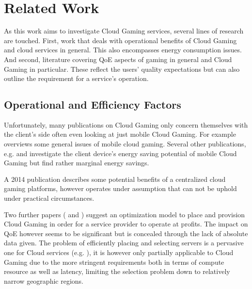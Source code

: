 \section{Related Work}
\label{sec:relatedwork}

As this work aims to investigate Cloud Gaming services, several lines of research are touched. 
First, work that deals with operational benefits of Cloud Gaming and cloud services in general. This also encompasses energy consumption issues.
And second, literature covering \gls{QoE} aspects of gaming in general and Cloud Gaming in particular. These reflect the users' quality expectations but can also outline the requirement for a service's operation.


\subsection{Operational and Efficiency Factors}

Unfortunately, many publications on Cloud Gaming only concern themselves with the client's side often even looking at just mobile Cloud Gaming. For example \cite{Soliman2013} overviews some general issues of mobile cloud gaming. Several other publications, e.g. \cite{6924295} and \cite{Huang:2014:MCP:2755535.2755542} investigate the client device's energy saving potential of mobile Cloud Gaming but find rather marginal energy savings.


A 2014 publication \cite{6882299} describes some potential benefits of a centralized cloud gaming platforms, however operates under assumption that can not be uphold under practical circumstances.

Two further papers (\cite{6853364} and \cite{6365107}) suggest an optimization model to place and provision Cloud Gaming  in order for a service provider to operate at profits. The impact on \gls{QoE} however seems to be significant but is concealed through the lack of absolute data given. The problem of efficiently placing and selecting servers is a pervasive one for Cloud services (e.g. \cite{6740249}), it is however only partially applicable to Cloud Gaming due to the more stringent requirements both in terms of compute resource as well as latency, limiting the selection problem down to relatively narrow geographic regions.



